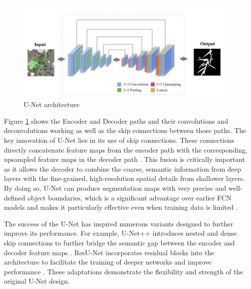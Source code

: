 \documentclass{report}
\begin{document}
\begin{figure}[H]
    \centering
    \includegraphics[width=1\linewidth]{Images_from_other_sources/unet_architecture.png}
    \caption{U-Net architecture \parencites[p.~178]{LuoEtAlSemanticsegmentationagriculturalimagessurvey2024}}
    \label{fig:U-Net architecture}
\end{figure}
Figure \ref{fig:U-Net architecture} shows the Encoder and Decoder paths and their convolutions and deconvolutions working as well as the skip connections between those paths.
The key innovation of U-Net lies in its use of skip connections. These connections directly concatenate feature maps from the encoder path with the corresponding, upsampled feature maps in the decoder path \parencites[p.~178]{LuoEtAlSemanticsegmentationagriculturalimagessurvey2024}. This fusion is critically important as it allows the decoder to combine the coarse, semantic information from deep layers with the fine-grained, high-resolution spatial details from shallower layers. By doing so, U-Net can produce segmentation maps with very precise and well-defined object boundaries, which is a significant advantage over earlier FCN models and makes it particularly effective even when training data is limited \parencite[p.~2]{SertelEtAlLandUseLandCoverMappingUsingDeepLearningBasedSegmentationApproachesVHRWorldview3Images2022}. \par
The success of the U-Net has inspired numerous variants designed to further improve its performance. For example, U-Net++ introduces nested and dense skip connections to further bridge the semantic gap between the encoder and decoder feature maps \parencites[p.~178]{LuoEtAlSemanticsegmentationagriculturalimagessurvey2024}. ResU-Net incorporates residual blocks into the architecture to facilitate the training of deeper networks and improve performance \parencites[p.~4]{DiakogiannisEtAlResUNetadeeplearningframeworksemanticsegmentationremotelysenseddata2020}. These adaptations demonstrate the flexibility and strength of the original U-Net design.
\end{document}
